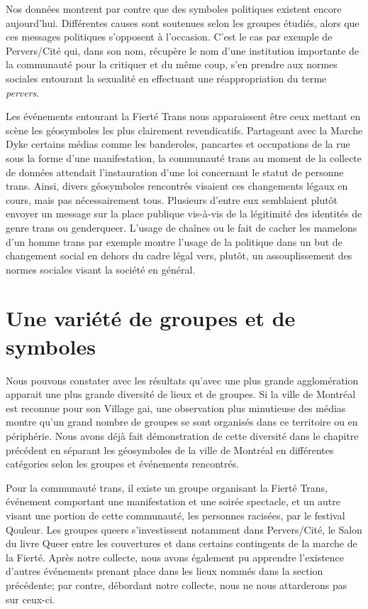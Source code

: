 Nos données montrent par contre que des symboles politiques existent encore aujourd'hui.
Différentes causes sont soutenues selon les groupes étudiés, alors que ces messages politiques s'opposent à l'occasion.
C'est le cas par exemple de Pervers/Cité qui, dans son nom, récupère le nom d'une institution importante de la communauté \lgbt{} pour la critiquer et du même coup, s'en prendre aux normes sociales entourant la sexualité en effectuant une réappropriation du terme \emph{pervers}. 

Les événements entourant la Fierté Trans nous apparaissent être ceux mettant en scène les géosymboles les plus clairement revendicatifs.
Partageant avec la Marche Dyke certains médias comme les banderoles, pancartes et occupations de la rue sous la forme d'une manifestation, la communauté trans au moment de la collecte de données attendait l'instauration d'une loi concernant le statut de personne trans.
Ainsi, divers géosymboles rencontrés visaient ces changements légaux en cours, mais pas nécessairement tous.
Plusieurs d'entre eux semblaient plutôt envoyer un message sur la place publique vis-à-vis de la légitimité des identités de genre trans ou genderqueer.
L'usage de chaînes ou le fait de cacher les mamelons d'un homme trans par exemple montre l'usage de la politique dans un but de changement social en dehors du cadre légal vers, plutôt, un assouplissement des normes sociales visant la société en général.

\section{Une variété de groupes et de symboles}
\label{sec:une_variete_de_groupes_et_de_symboles}
Nous pouvons constater avec les résultats qu'avec une plus grande agglomération apparait une plus grande diversité de lieux et de groupes.
Si la ville de Montréal est reconnue pour son Village gai, une observation plus minutieuse des médias \lgbt montre qu'un grand nombre de groupes se sont organisés dans ce territoire ou en périphérie.
Nous avons déjà fait démonstration de cette diversité dans le chapitre précédent en séparant les géosymboles de la ville de Montréal en différentes catégories selon les groupes et événements rencontrés.

Pour la communauté trans, il existe un groupe organisant la Fierté Trans, événement comportant une manifestation et une soirée spectacle, et un autre visant une portion de cette communauté, les personnes racisées, par le festival Qouleur.
Les groupes queers s'investissent notamment dans Pervers/Cité, le Salon du livre Queer entre les couvertures et dans certains contingents de la marche de la Fierté. 
Après notre collecte, nous avons également pu apprendre l'existence d'autres événements prenant place dans les lieux nommés dans la section précédente; par contre, débordant notre collecte, nous ne nous attarderons pas sur ceux-ci.


